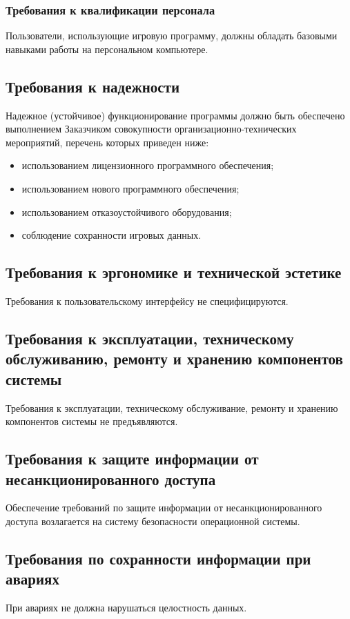 \subsubsection{Требования к квалификации персонала}
Пользователи, использующие игровую программу, должны обладать базовыми навыками работы на 
персональном компьютере.

\subsection{Требования к надежности}
Надежное (устойчивое) функционирование программы должно быть обеспечено выполнением 
Заказчиком совокупности организационно-технических мероприятий, перечень которых приведен 
ниже: 
\begin{itemize}
    \item использованием лицензионного программного обеспечения; 
    \item использованием нового программного обеспечения;
    \item использованием отказоустойчивого оборудования;
    \item соблюдение сохранности игровых данных.
\end{itemize}

\subsection{Требования к эргономике и технической эстетике}
Требования к пользовательскому интерфейсу не специфицируются.

\subsection{Требования к эксплуатации, техническому обслуживанию, ремонту и хранению компонентов 
    системы}
Требования к эксплуатации, техническому обслуживание, ремонту и хранению компонентов системы 
не предъявляются.

\subsection{Требования к защите информации от несанкционированного доступа}
Обеспечение требований по защите информации от несанкционированного доступа возлагается на 
систему безопасности операционной системы.

\subsection{Требования по сохранности информации при авариях}
При авариях не должна нарушаться целостность данных. 

